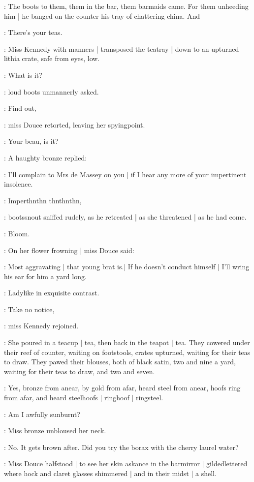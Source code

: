 :
The boots to them,
them in the bar,
them barmaids came.
For them unheeding him |
he banged on the counter his tray of chattering china.
And

\boots:
There's your teas.

:
Miss Kennedy with manners |
transposed the teatray |
down to an upturned lithia crate,
safe from eyes,
low.

\boots:
What is it?

:
loud boots unmannerly asked.

\MissD:
Find out,

:
miss Douce retorted,
leaving her spyingpoint.

\boots:
Your beau, is it?

:
A haughty bronze replied:

\MissD:
I'll complain to Mrs de Massey on you |
if I hear any more of your impertinent insolence.

\boots:
Imperthnthn thnthnthn,

:
bootssnout sniffed rudely,
as he retreated |
as she threatened |
as he had come.

:
Bloom.

:
On her flower frowning |
miss Douce said:

\MissD:
Most aggravating |
that young brat is.|
If he doesn't conduct himself |
I'll wring his ear for him a yard long.

:
Ladylike in exquisite contrast.

\MissK:
Take no notice,

:
miss Kennedy rejoined.

:
She poured in a teacup |
tea,
then back in the teapot |
tea.
They cowered under their reef of counter,
waiting on footstools,
crates upturned,
waiting for their teas to draw.
They pawed their blouses,
both of black satin,
two and nine a yard,
waiting for their teas to draw,
and two and seven.

:
Yes,
bronze from anear,
by gold from afar,
heard steel from anear,
hoofs ring from afar,
and heard steelhoofs |
ringhoof |
ringsteel.

\MissD:
Am I awfully sunburnt?

:
Miss bronze unbloused her neck.

\MissK:
No.
It gets brown after.
Did you try the borax with the cherry laurel water?

:
Miss Douce halfstood |
to see her skin askance in the barmirror |
gildedlettered where hock and claret glasses shimmered |
and in their midst |
a shell.

